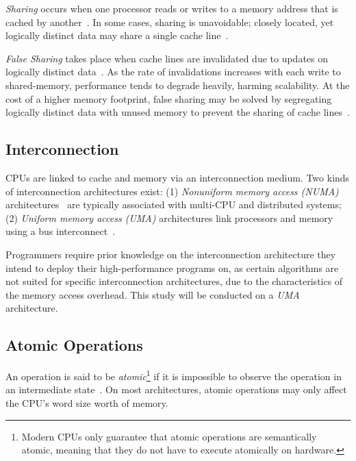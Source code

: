 \emph{Sharing} occurs when one processor reads or writes to a memory address that
is cached by another~\citep{herlihy2020art_cachecoherence}. In some cases,
sharing is unavoidable; closely located, yet
logically distinct data may share a single cache
line~\citep{herlihy2020art_cachecoherence}. 

\emph{False Sharing} takes place when cache lines are invalidated due to updates
on logically distinct data~\citep{herlihy2020art_cachecoherence}. As the
rate of invalidations increases with each write to shared-memory, performance
tends to degrade heavily, harming scalability. At the cost of a higher memory footprint, false
sharing may be solved by segregating logically distinct data with unused memory
to prevent the sharing of cache lines~\citep{scott2013shared}.

\subsection{Interconnection}

CPUs are linked to cache and memory via an interconnection medium.
Two kinds of interconnection architectures exist: (1)
\emph{Nonuniform memory access (NUMA)}
architectures~\citep[Appendix~B.3]{herlihy2020art} are typically associated with
multi-CPU and distributed systems; (2) \emph{Uniform memory
access (UMA)} architectures link processors and memory using a bus
interconnect~\citep[Appendix~B.3]{herlihy2020art}.

Programmers require prior knowledge on the interconnection architecture they
intend to deploy their high-performance programs on, as certain algorithms are not suited for specific interconnection
architectures, due to the characteristics of the memory access overhead. This study will be
conducted on a \emph{UMA} architecture.

\subsection{Atomic Operations}
An operation is said to be \emph{atomic}\footnote{Modern CPUs only guarantee
that atomic operations are semantically atomic, meaning that they do not
have to execute atomically on hardware.} if it is impossible to observe the operation in an
intermediate state~\citep{perfbook2021}. On most architectures, atomic
operations may only affect the CPU's word size worth of memory.

